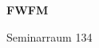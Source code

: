 \documentclass[a4paper]{article}
\begin{document}
\printGenericVSLHeader
\begin{center}
\begin{vsltext}{3cm}{4cm}

   \vspace{0.5cm} 

    \textbf{FWFM} 

    \vspace{1.5cm}

    Seminarraum 134

\end{vsltext}

\end{center}
\end{document}
